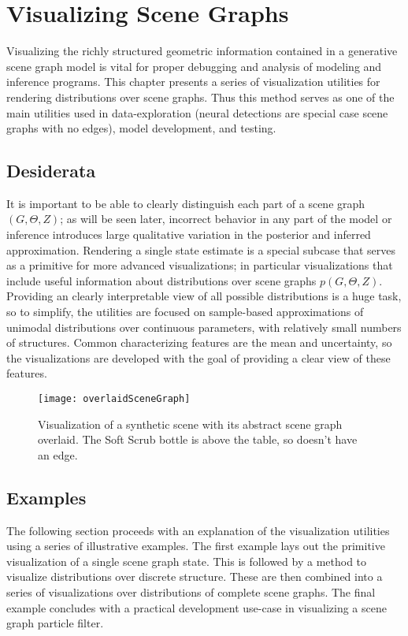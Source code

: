 \chapter{Visualizing Scene Graphs} \label{chap:3}
Visualizing the richly structured geometric information contained in a generative scene graph model is vital for proper debugging and analysis of modeling and inference programs.
This chapter presents a series of visualization utilities for rendering distributions over scene graphs.
Thus this method serves as one of the main utilities used in data-exploration (neural detections are special case scene graphs with no edges), model development, and testing.

\section{Desiderata}
It is important to be able to clearly distinguish each part of a scene graph $(G, \Theta, Z)$; as will be seen later, incorrect behavior in any part of the model or inference introduces large qualitative variation in the posterior and inferred approximation.
Rendering a single state estimate is a special subcase that serves as a primitive for more advanced visualizations; in particular visualizations that include useful information about distributions over scene graphs $p(G, \Theta, Z)$.
Providing an clearly interpretable view of all possible distributions is a huge task, so to simplify, the utilities are focused on sample-based approximations of unimodal distributions over continuous parameters, with relatively small numbers of structures.
Common characterizing features are the mean and uncertainty, so the visualizations are developed with the goal of providing a clear view of these features.

\begin{figure}[H]
  \centering
  \texttt{[image: overlaidSceneGraph]}
  \caption{
    Visualization of a synthetic scene with its abstract scene graph overlaid.
    The Soft Scrub bottle is above the table, so doesn't have an edge.
  }
  \label{fig:overlaidSceneGraph}
\end{figure}
\section{Examples}
The following section proceeds with an explanation of the visualization utilities using a series of illustrative examples.
The first example lays out the primitive visualization of a single scene graph state.
This is followed by a method to visualize distributions over discrete structure.
These are then combined into a series of visualizations over distributions of complete scene graphs.
The final example concludes with a practical development use-case in visualizing a scene graph particle filter.

